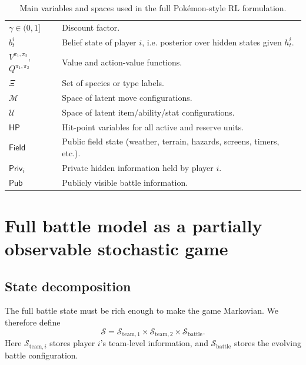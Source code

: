 \documentclass[aps,pre,twocolumn,superscriptaddress,nofootinbib]{revtex4-2}
\newcommand{\cS}{\mathcal{S}}
\newcommand{\cM}{\mathcal{M}}
\newcommand{\cU}{\mathcal{U}}
\theoremstyle{definition}
\theoremstyle{plain}
\begin{document}
\begin{table}[t]
\begin{tabular}{p{} p{}}
        $\gamma \in (0,1]$                   & Discount factor.                                                             \\
        $b_t^i$                              & Belief state of player $i$, i.e. posterior over hidden states given $h_t^i$. \\
        $V^{\pi_1,\pi_2}$, $Q^{\pi_1,\pi_2}$ & Value and action-value functions.                                            \\
        $\Xi$                                & Set of species or type labels.                                               \\
        $\cM$                                & Space of latent move configurations.                                         \\
        $\cU$                                & Space of latent item/ability/stat configurations.                            \\
        $\mathsf{HP}$                        & Hit-point variables for all active and reserve units.                        \\
        $\mathsf{Field}$                     & Public field state (weather, terrain, hazards, screens, timers, etc.).       \\
        $\mathsf{Priv}_i$                    & Private hidden information held by player $i$.                               \\
        $\mathsf{Pub}$                       & Publicly visible battle information.                                         \\
        \bottomrule
    \end{tabular}
    \caption{Main variables and spaces used in the full Pok\'emon-style RL formulation.}
    \label{tab:variables}
\end{table}

\section{Full battle model as a partially observable stochastic game}
\label{sec:fullmodel}

\subsection{State decomposition}

The full battle state must be rich enough to make the game Markovian. We therefore define
\begin{equation}
    \cS = \cS_{\mathrm{team},1} \times \cS_{\mathrm{team},2} \times \cS_{\mathrm{battle}}.
\end{equation}
Here $\cS_{\mathrm{team},i}$ stores player $i$'s team-level information, and $\cS_{\mathrm{battle}}$ stores the evolving battle configuration.
\end{document}
